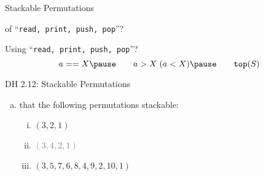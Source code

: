 \begin{frame}{}
  \centerline{\LARGE Stackable Permutations}

  \vspace{0.40cm}
  \pause
\end{frame}


\begin{frame}{}
  \begin{definition}

  \end{definition}
\end{frame}

\begin{frame}{}
  \begin{definition}
  \end{definition}

  \vspace{0.40cm}
  \pause
    of ``\texttt{read, print, push, pop}''?

  \vspace{0.20cm}
  \pause
   Using  ``\texttt{read, print, push, pop}''?
    \[
      a == X  \pause \qquad a > X \; (a < X) \pause \qquad \texttt{top}(S)
    \]
\end{frame}
\begin{frame}{}
  \begin{exampleblock}{DH 2.12: Stackable Permutations}
    \begin{enumerate}[(a)]
      \item {} that the following permutations \emph{} stackable:
	\begin{enumerate}[(i)]
	  \item $(3, 2, 1)$
	  \item \textcolor{gray}{$(3, 4, 2, 1)$}
	  \item $(3, 5, 7, 6, 8, 4, 9, 2, 10, 1)$
	\end{enumerate}
    \end{enumerate}
  \end{exampleblock}

  \vspace{0.50cm}
\end{frame}

